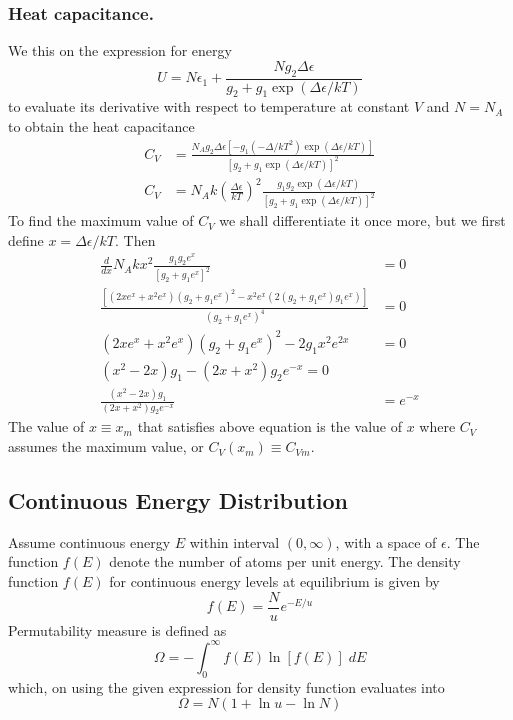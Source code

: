 \documentclass[../../../Main.tex]{subfiles}
\begin{document}
\subsubsection*{Heat capacitance.} We this on the expression for energy 
\begin{equation*}
    U=N\epsilon_1+\frac{Ng_2\Delta\epsilon}{g_2+g_1\exp(\Delta\epsilon/kT)}
\end{equation*}
to evaluate its derivative with respect to temperature at constant $V$ and $N=N_A$ to obtain the heat capacitance
\begin{align*}
    C_V&=\frac{N_Ag_2\Delta\epsilon\left[-g_1(-\Delta/kT^2)\exp (\Delta \epsilon/kT) \right]}{\left[g_2+g_1\exp(\Delta\epsilon/kT)\right]^2}\\
    C_V&=N_Ak\left(\frac{\Delta\epsilon}{kT}\right)^2\frac{g_1g_2\exp(\Delta\epsilon/kT)}{\left[g_2+g_1\exp(\Delta\epsilon/kT)\right]^2}
\end{align*}
To find the maximum value of $C_V$ we shall differentiate it once more, but we first define $x=\Delta\epsilon/kT$. Then 
\begin{align*}
    \frac{d}{dx}N_Akx^2\frac{g_1g_2e^x}{\left[g_2+g_1e^x\right]^2}&=0\\
    \frac{\left[(2xe^x+x^2e^x)(g_2+g_1e^x)^2-x^2e^x(2(g_2+g_1e^x)g_1e^x)\right]}{(g_2+g_1e^x)^4}&=0\\
    (2xe^x+x^2e^x)(g_2+g_1e^x)^2-2g_1x^2e^{2x}&=0\\
    (x^2-2x)g_1-(2x+x^2)g_2e^{-x}=0\\
   \frac{(x^2-2x)g_1}{(2x+x^2)g_2e^{-x}} &=e^{-x}
\end{align*}
The value of $x\equiv x_m$ that satisfies above equation is the value of $x$ where $C_V$ assumes the maximum value, or $C_V(x_m)\equiv C_{Vm}$.

\subsection*{Continuous Energy Distribution}
Assume continuous energy $E$ within interval $(0,\infty)$, with a space of $\epsilon$. The function $f(E)$ denote the number of atoms per unit energy. The density function $f(E) $ for continuous energy levels at equilibrium is given by
\begin{equation*}
    f(E)=\frac{N}{u}e^{-E/u}
\end{equation*}
Permutability measure is defined as 
\begin{equation*}
    \Omega=-\int_{0}^{\infty}f(E)\ln\left[f(E)\right]\;dE
\end{equation*}
which, on using the given expression for density function evaluates into 
\begin{equation*}
    \Omega=N(1+\ln u-\ln N)
\end{equation*}
\end{document}
